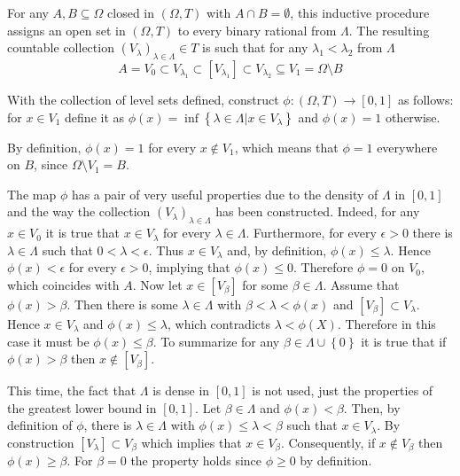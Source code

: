 \documentclass[a4paper]{article}
\newcommand{\obj}[1]{\left\{{#1}\right\}}
\newcommand{\clo}[1]{\left [{#1}\right]}
\newcommand{\brac}[1]{{\left({#1}\right)}}
\begin{document}
For any $A,B\subseteq \Omega$ closed in $\brac{\Omega, T}$ with $A\cap B = \emptyset$, this inductive procedure assigns an open set in $\brac{\Omega, T}$ to every binary rational from $\Lambda$. The resulting countable collection $\brac{V_\lambda}_{\lambda\in \Lambda} \in T$ is such that for any $\lambda_1 < \lambda_2$ from $\Lambda$ \[A = V_0 \subset V_{\lambda_1} \subset \clo{V_{\lambda_1}} \subset V_{\lambda_2} \subseteq V_1 = \Omega \setminus B\]

With the collection of level sets defined, construct $\phi:\brac{\Omega, T}\to \clo{0,1}$ as follows: for $x\in V_1$ define it as $\phi(x) = \inf \obj{\lambda \in \Lambda \vert x\in V_\lambda}$ and $\phi(x) = 1$ otherwise.

By definition, $\phi(x) = 1$ for every $x\notin V_1$, which means that $\phi = 1$ everywhere on $B$, since $\Omega \setminus V_1 = B$.

The map $\phi$ has a pair of very useful properties due to the density of $\Lambda$ in $\clo{0,1}$ and the way the collection $\brac{V_\lambda}_{\lambda \in \Lambda}$ has been constructed. Indeed, for any $x\in V_0$ it is true that $x\in V_\lambda$ for every $\lambda \in \Lambda$. Furthermore, for every $\epsilon > 0$ there is $\lambda \in \Lambda$ such that $0 < \lambda < \epsilon$. Thus $x\in V_\lambda$ and, by definition, $\phi(x) \leq \lambda$. Hence $\phi(x) < \epsilon$ for every $\epsilon > 0$, implying that $\phi(x)\leq 0$. Therefore $\phi = 0$ on $V_0$, which coincides with $A$. Now let $x\in \clo{V_\beta}$ for some $\beta \in \Lambda$. Assume that $\phi(x) > \beta$. Then there is some $\lambda \in \Lambda$ with $\beta < \lambda < \phi(x)$ and $\clo{V_\beta} \subset V_\lambda$. Hence $x \in V_\lambda$ and $\phi(x) \leq \lambda$, which contradicts $\lambda < \phi(X)$. Therefore in this case it must be $\phi(x)\leq \beta$. To summarize for any $\beta\in \Lambda\cup \obj{0}$ it is true that if $\phi(x) > \beta$ then $x \notin \clo{V_\beta}$.

This time, the fact that $\Lambda$ is dense in $\clo{0,1}$ is not used, just the properties of the greatest lower bound in $\clo{0,1}$. Let $\beta \in \Lambda$ and $\phi(x) < \beta$. Then, by definition of $\phi$, there is $\lambda\in \Lambda$ with $\phi(x) \leq \lambda < \beta$ such that $x\in V_\lambda$. By construction $\clo{V_\lambda} \subset V_\beta$ which implies that $x\in V_\beta$. Consequently, if $x\notin V_\beta$ then $\phi(x)\geq \beta$. For $\beta = 0$ the property holds since $\phi\geq 0$ by definition.
\end{document}
